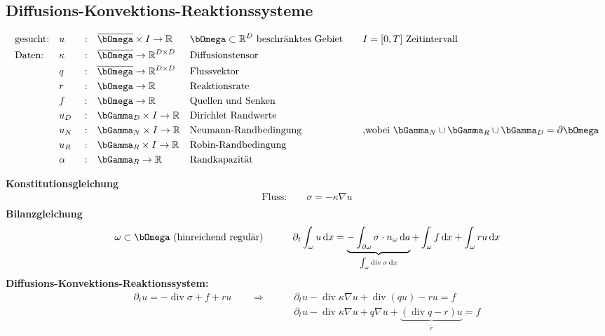 \documentclass[12pt,twoside,reqno]{article}
\newcommand{\dx}{\,\mathrm{d}x}
\newcommand{\da}{\,\mathrm{d}a}
\renewcommand\div{\operatorname{div}}
\renewcommand{\Omega}{\bOmega}
\renewcommand{\Gamma}{\bGamma}
\newcommand{\R}{\mathbb{R}}
\newcommand{\rs}{\tilde{r}}
\theoremstyle{TheoWieners}
\theoremstyle{break}
\theoremstyle{app}
\newtheorem{Spezielle Lösungen}[app]{Spezielle Lösungen}
\newtheorem{Spezielle Lösungen der Poisson-Gleichung}[app]{Spezielle Lösungen der Poisson-Gleichung}
\newtheorem{Kartesische Gitter in 2-d}[app]{Kartesische Gitter in 2-d}
\newtheorem{Diskretisierungen hoher Ordnung}[app]{Diskretisierungen hoher Ordnung}
\newtheorem{Zyklische Reduktion}[app]{Zyklische Reduktion}
\begin{document}
\subsection{Diffusions-Konvektions-Reaktionssysteme}
    \begin{align*}
        &\text{gesucht:}  &&u&&:&& \overline{\Omega} \times I \rightarrow \R && \Omega \subset \R^D \text{ beschränktes Gebiet } \ \ &&I=[0,T] \text{ Zeitintervall }\\
        &\text{Daten:} &&\kappa&& :&&  \overline{\Omega} \rightarrow \R^{D\times D}        && \text{Diffusionstensor} \\
                & &&q&&:&&  \overline{\Omega} \rightarrow \R^{D\times D}                        && \text{Flussvektor} \\
                & &&r&&:&&  \Omega \rightarrow \R                      && \text{Reaktionsrate} \\
                & &&f&&:&&  \Omega \rightarrow \R                        && \text{Quellen und Senken} \\
                & &&u_D&&:&&  \Gamma_D \times I \rightarrow \R                       && \text{Dirichlet Randwerte} \\
                & &&u_N&&:&&  \Gamma_N \times I  \rightarrow \R                        && \text{Neumann-Randbedingung} &&\text{,wobei }\Gamma_N \cup \Gamma_R \cup \Gamma_D = \partial \Omega \\
                & &&u_R&&:&& \Gamma_R \times I  \rightarrow \R                        && \text{Robin-Randbedingung} \\ 
                & &&\alpha&&:&&  \Gamma_R  \rightarrow \R                       && \text{Randkapazität}           \end{align*}

\textbf{Konstitutionsgleichung}
    \begin{align*}
        \text{Fluss:}\qquad \sigma =-\kappa \nabla u \\
    \end{align*}
\textbf{Bilanzgleichung}
 \begin{align*}
        &\omega \subset \Omega \text{ (hinreichend regulär)}    \qquad &&\partial_t \int_\omega u \dx =  \underbrace{ -\int_{\partial \omega} \sigma \cdot n_\omega \da}
	    _{\int_\omega \div \sigma \dx} +\int_\omega f \dx + \int_\omega ru \dx  \\
    \end{align*}
        \textbf{Diffusions-Konvektions-Reaktionssystem:}
        \begin{align*} %
\partial_t u= -\div \sigma + f +ru \qquad \Longrightarrow \qquad &\partial_t u -\div \kappa \nabla u + \div(qu)-ru = f \\ &\partial_t u -\div \kappa \nabla u + q\nabla u + \underbrace{(\div q- r)u}_{\rs} = f        \end{align*}
      
\end{document}
